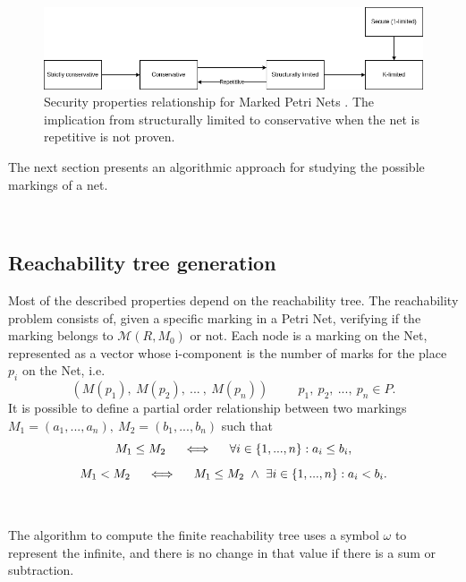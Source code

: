 \documentclass[12pt,english]{article} %
\begin{document}
\begin{figure}[H]
    \centering
    \includegraphics[scale=0.6]{img/petri-net/mpn/property/mpn-security-properties-summary.png}
    \caption{Security properties relationship for Marked Petri Nets \cite{lecture-notes-concurrent-systems-validation}.
    The implication from structurally limited to conservative when the net is repetitive is not proven.}
    \label{fig:mpn-security-property-summary}
\end{figure}


The next section presents an algorithmic approach for studying the possible markings of a net.

\

\subsection{Reachability tree generation}
Most of the described properties depend on the reachability tree.
The reachability problem consists of, given a specific marking in a Petri Net, verifying if the marking belongs to $\mathcal{M}(R, M_0)$ or not.
Each node is a marking on the Net, represented as a vector whose i-component is the number of marks for the place $p_i$ on the Net, i.e. $$(M(p_1),\ M(p_2),\ ...\ ,\ M(p_n)) \hspace{1cm} p_1,\ p_2,\ ...,\ p_n\in P.$$
It is possible to define a partial order relationship between two markings $M_1 = (a_1, ..., a_n),\ M_2 = (b_1, ..., b_n)$ such that
$$M_1 \leq M_2\hspace{0.5cm} \Longleftrightarrow \hspace{0.5cm} \forall i\in \{1, ..., n\} : a_i \leq b_i,$$
\begin{equation}
\label{eqn:mpn-order-relationship}
M_1 < M_2\hspace{0.5cm} \Longleftrightarrow \hspace{0.5cm} M_1 \leq M_2 \ \wedge \ \exists i\in \{1, ..., n\} : a_i < b_i.
\end{equation}

\

The algorithm to compute the finite reachability tree uses a symbol $\omega$ to represent the infinite, and there is no change in that value if there is a sum or subtraction.
\end{document}
